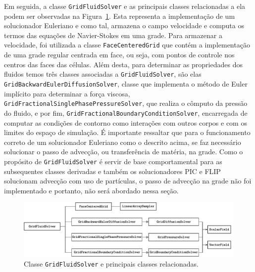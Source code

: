 \documentclass[12pt,a4paper,dvipsnames]{article}
\newcommand{\figref}[1]{Figura~\ref{#1}}
\begin{document}
Em seguida, a classe \texttt{GridFluidSolver} e as principais classes relacionadas a ela podem ser observadas na \figref{fig:gridfluidsolver}. Esta representa a implementação de um solucionador Euleriano e como tal, armazena o campo velocidade e computa os termos das equações de Navier-Stokes em uma grade. Para armazenar a velocidade, foi utilizada a classe \texttt{FaceCenteredGrid} que contém a implementação de uma grade regular centrada em face, ou seja, com pontos de controle nos centros das faces das células. Além desta, para determinar as propriedades dos fluidos temos três classes associadas a \texttt{GridFluidSolver}, são elas
\texttt{GridBackwardEulerDiffusionSolver}, classe que implementa o método de Euler implícito para determinar a força viscosa, \texttt{GridFractionalSinglePhasePressureSolver}, que realiza o cômputo da pressão do fluido, e por fim,  \texttt{GridFractionalBoundaryConditionSolver}, encarregada de computar as condições de contorno como interações com outros corpos e com os limites do espaço de simulação. É importante ressaltar que para o funcionamento correto de um solucionador Euleriano como o descrito acima, se faz necessário solucionar o passo de advecção, ou transferência de matéria, na grade. Como o propósito de \texttt{GridFluidSolver} é servir de base comportamental para as subsequentes classes derivadas e também os solucionadores PIC e FLIP solucionam advecção com uso de partículas, o passo de advecção na grade não foi implementado e portanto, não será abordado nessa seção.

\begin{figure}[ht]
    \centering
    \includegraphics[width=\textwidth]{GridFluidSolverDiagram.pdf}
    \caption{Classe \texttt{GridFluidSolver} e principais classes relacionadas.}
    \label{fig:gridfluidsolver}
\end{figure}
\end{document}
